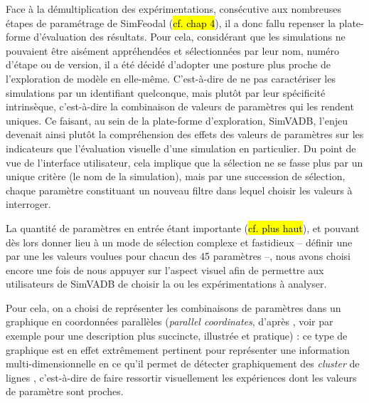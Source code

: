 	Face à la démultiplication des expérimentations, consécutive aux nombreuses étapes de paramétrage de SimFeodal (\hl{cf. chap 4}), il a donc fallu repenser la plate-forme d'évaluation des résultats.
	Pour cela, considérant que les simulations ne pouvaient être aisément appréhendées et sélectionnées par leur nom, numéro d'étape ou de version, il a été décidé d'adopter une posture plus proche de l'exploration de modèle en elle-même.
	C'est-à-dire de ne pas caractériser les simulations par un identifiant quelconque, mais plutôt par leur spécificité intrinsèque, c'est-à-dire la combinaison de valeurs de paramètres qui les rendent uniques.
	Ce faisant, au sein de la plate-forme d'exploration, SimVADB, l'enjeu devenait ainsi plutôt la compréhension des effets des valeurs de paramètres sur les indicateurs que l'évaluation visuelle d'une simulation en particulier.
	Du point de vue de l'interface utilisateur, cela implique que la sélection ne se fasse plus par un unique critère (le nom de la simulation), mais par une succession de sélection, chaque paramètre constituant un nouveau filtre dans lequel choisir les valeurs à interroger.

	La quantité de paramètres en entrée étant importante (\hl{cf. plus haut}), et pouvant dès lors donner lieu à un mode de sélection complexe et fastidieux -- définir une par une les valeurs voulues pour chacun des 45 paramètres --, nous avons choisi encore une fois de nous appuyer sur l'aspect visuel afin de permettre aux utilisateurs de SimVADB de choisir la ou les expérimentations à analyser.

	Pour cela, on a choisi de représenter les combinaisons de paramètres dans un graphique en \og coordonnées parallèles \fg{} (\textit{parallel coordinates}, d'après \cite{inselberg_parallel_1987}, voir \cite{few_multivariate_2006} par exemple pour une description plus succincte, illustrée et pratique) :
	ce type de graphique est en effet extrêmement pertinent pour représenter une information multi-dimensionnelle en ce qu'il permet de détecter graphiquement des \textit{cluster} de lignes \autocite[2]{heinrich_state_2013}, c'est-à-dire de faire ressortir visuellement les expériences dont les valeurs de paramètre sont proches.


